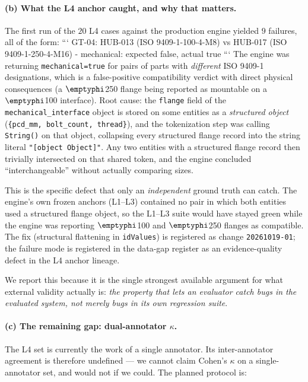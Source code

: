\documentclass[11pt,twocolumn]{article}
\begin{document}
\paragraph{(b) What the L4 anchor caught, and why that matters.}
The first run of the $20$ L4 cases against the production engine
yielded $9$ failures, all of the form:
```
GT-04: HUB-013 (ISO 9409-1-100-4-M8) vs HUB-017 (ISO 9409-1-250-4-M16)
     - mechanical: expected false, actual true
```
The engine was returning \texttt{mechanical=true} for pairs of parts
with \emph{different} ISO 9409-1 designations, which is a
false-positive compatibility verdict with direct physical
consequences (a $\emptyphi$250 flange being reported as mountable on a
$\emptyphi$100 interface). Root cause: the \texttt{flange} field of
the \texttt{mechanical\_interface} object is stored on some entities
as a \emph{structured object} (\texttt{\{pcd\_mm, bolt\_count,
thread\}}), and the tokenization step was calling \texttt{String()}
on that object, collapsing every structured flange record into the
string literal \texttt{"[object Object]"}. Any two entities with a
structured flange record then trivially intersected on that shared
token, and the engine concluded ``interchangeable'' without actually
comparing sizes.

This is the specific defect that only an \emph{independent} ground
truth can catch. The engine's own frozen anchors (L1--L3) contained
no pair in which both entities used a structured flange object, so
the L1--L3 suite would have stayed green while the engine was
reporting $\emptyphi$100 and $\emptyphi$250 flanges as compatible. The
fix (structural flattening in \texttt{idValues}) is registered as
change \texttt{20261019-01}; the failure mode is registered in the
data-gap register as an evidence-quality defect in the L4 anchor
lineage.

We report this because it is the single strongest available
argument for what external validity actually is: \emph{the property
that lets an evaluator catch bugs in the evaluated system, not
merely bugs in its own regression suite}.

\paragraph{(c) The remaining gap: dual-annotator $\kappa$.}
The L4 set is currently the work of a single annotator. Its
inter-annotator agreement is therefore undefined --- we cannot claim
Cohen's $\kappa$ on a single-annotator set, and would not if we
could. The planned protocol is:
\end{document}
